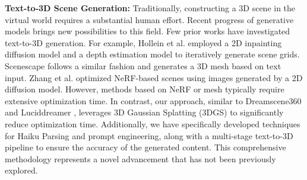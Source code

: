 \noindent\textbf{Text-to-3D Scene Generation:}
    Traditionally, constructing a 3D scene in the virtual world requires a substantial human effort. Recent progress of generative models brings new possibilities to this field. Few prior works have investigated text-to-3D generation. For example, Hollein et al. \cite{hollein2023text2room} employed a 2D inpainting diffusion model and a depth estimation model to iteratively generate scene grids. Scenescape \cite{fridman2024scenescape} follows a similar fashion and generates a 3D mesh based on text input. Zhang et al. \cite{zhang2024text2nerf} optimized NeRF-based scenes using images generated by a 2D diffusion model. However, methods based on NeRF or mesh typically require extensive optimization time. In contrast, our approach, similar to Dreamscene360 \cite{zhou2025dreamscene360} and Luciddreamer \cite{chung2023luciddreamer}, leverages 3D Gaussian Splatting (3DGS) to significantly reduce optimization time. Additionally, we have specifically developed techniques for Haiku Parsing and prompt engineering, along with a multi-stage text-to-3D pipeline to ensure the accuracy of the generated content. This comprehensive methodology represents a novel advancement that has not been previously explored.
\vspace{-0.2cm}